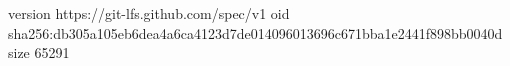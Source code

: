 version https://git-lfs.github.com/spec/v1
oid sha256:db305a105eb6dea4a6ca4123d7de014096013696c671bba1e2441f898bb0040d
size 65291
